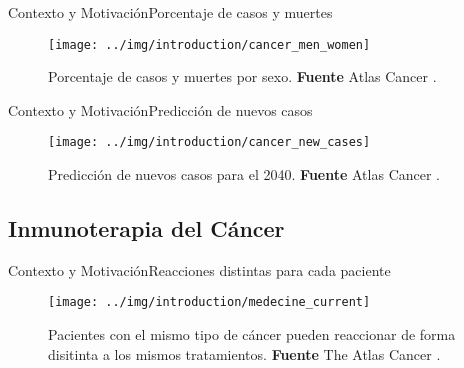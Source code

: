 \documentclass[10pt]{beamer}
\newcommand{\1}{
	\setbeamertemplate{background}{
		\texttt{[image: img/1]}
		\tikz[overlay] \fill[fill opacity=0.75,fill=white] (0,0) rectangle (-\paperwidth,\paperheight);
	}
}
\begin{document}
\begin{frame}{Contexto y Motivación}{Porcentaje de casos y muertes}
	\begin{figure}[]
		\centering
		\texttt{[image: ../img/introduction/cancer\_men\_women]}
		\caption{Porcentaje de casos y muertes por sexo. \textbf{Fuente} Atlas Cancer \cite{canceratlas2023}.}
	\end{figure}
\end{frame}

\begin{frame}{Contexto y Motivación}{Predicción de nuevos casos}
	\begin{figure}[]
		\centering
		\texttt{[image: ../img/introduction/cancer\_new\_cases]}
		\caption{Predicción de nuevos casos para el 2040. \textbf{Fuente} Atlas Cancer \cite{canceratlas2023}.}
	\end{figure}
\end{frame}

\subsection{Inmunoterapia del Cáncer}



\begin{frame}{Contexto y Motivación}{Reacciones distintas para cada paciente}

	\begin{figure}[]
		\centering
		\texttt{[image: ../img/introduction/medecine\_current]}
			\caption{Pacientes con el mismo tipo de cáncer pueden reaccionar de forma disitinta a los mismos tratamientos. \textbf{Fuente} The Atlas Cancer \cite{pdx2023}.}
	\end{figure}
\end{frame}
\end{document}
